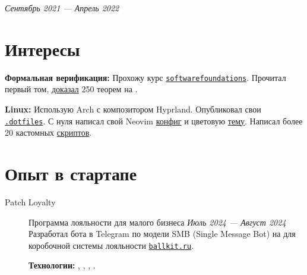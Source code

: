 \documentclass[margin,line]{resume}
\begin{document}
\begin{resume}
  \vspace{-7mm}

  \hfill \textsl{Сентябрь 2021 — Апрель 2022}
  \vspace{-4mm}
  \section{\mysidestyle Интересы}\vspace{0.7mm}

  {\textbf{Формальная верификация:} Прохожу курс
    \texttt{\href{https://softwarefoundations.cis.upenn.edu}{softwarefoundations}}.
    Прочитал первый том,
    \href{https://github.com/alchemmist/coq-learning}{доказал} 250
  теорем на .} \\

  \vspace{-6mm}

  \textbf{Linux:} Использую Arch с композитором Hyprland. Опубликовал
  свои
  \href{https:/github.com/alchemmist/.dotfiles}{\texttt{.dotfiles}}.
  С нуля написал свой Neovim
  \href{https://github.com/alchemmist/.dotfiles/tree/main/nvim}{конфиг}
  и цветовую
  \href{https://github.com/alchemmist/nothing.nvim}{тему}.
  Написал более 20 кастомных
  \href{https://github.com/alchemmist/.dotfiles/tree/main/scripts}{скриптов}.

  \vfill

  \section{\mysidestyle Опыт в стартапе}\vspace{2mm}

  \begin{description}

    \item[Patch Loyalty]\small Программа лояльности для малого бизнеса \hfill
      \textsl{Июль 2024 — Август 2024\vspace{1mm}}\\
      Разработал бота в Telegram по модели SMB (Single Message Bot) на
       для коробочной системы лояльности
      \href{https://ballkit.ru}{\texttt{ballkit.ru}}.

      \textbf{Технологии:}
      ,
      , ,
      .
  \end{description}


\end{resume}
\end{document}
